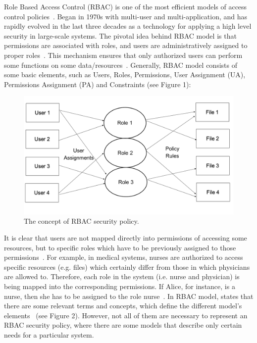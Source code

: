 Role Based Access Control (RBAC) is one of the most efficient models of access control policies~\cite{AhHu2007}.  Began in 1970s with multi-user and multi-application, and has rapidly evolved in the last three decades as a technology for applying a high level security in large-scale systems.  The pivotal idea behind RBAC model is that permissions are associated with roles, and users are administratively assigned to proper roles~\cite{Zha2008}. This mechanism ensures that only authorized users can perform some functions on some data/resources~\cite{FeKu2009}. Generally, RBAC model consists of some basic elements, such as Users, Roles, Permissions, User Assignment (UA), Permissions Assignment (PA) and Constraints (see Figure 1):

\begin{figure}[bht]
\centering
\includegraphics[scale=0.26]{RBACpolicy.png}
\caption{The concept of RBAC security policy.}
\label{fig:RBACPol}
\end{figure}


It is clear that users are not mapped directly into permissions of accessing some resources, but to specific roles which have to be previously assigned to those permissions~\cite{YuBr2012}.  For example, in medical systems, nurses are authorized to access specific resources (e.g. files) which certainly differ from those in which physicians are allowed to.  Therefore, each role in the system (i.e. nurse and physician) is being mapped into the corresponding permissions.  If Alice, for instance, is a nurse, then she has to be assigned to the role nurse~\cite{DBS2004}. 
      In RBAC model, states that there are some relevant terms and concepts, which define the different model’s elements~\cite{SDAG2008} (see Figure 2).  However, not all of them are necessary to represent an RBAC security policy, where there are some models that describe only certain needs for a particular system.

